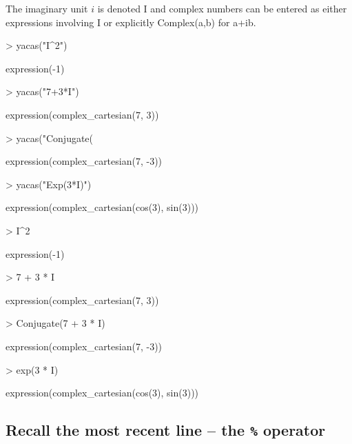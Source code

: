\documentclass[]{article}
\begin{document}
The imaginary unit $i$ is denoted I and complex numbers can be entered
as either expressions involving I or explicitly Complex(a,b) for a+ib.
\begin{Schunk}
\begin{Sinput}
> yacas("I^2")
\end{Sinput}
\begin{Soutput}
expression(-1)
\end{Soutput}
\begin{Sinput}
> yacas("7+3*I")
\end{Sinput}
\begin{Soutput}
expression(complex_cartesian(7, 3))
\end{Soutput}
\begin{Sinput}
> yacas("Conjugate(%)")
\end{Sinput}
\begin{Soutput}
expression(complex_cartesian(7, -3))
\end{Soutput}
\begin{Sinput}
> yacas("Exp(3*I)")
\end{Sinput}
\begin{Soutput}
expression(complex_cartesian(cos(3), sin(3)))
\end{Soutput}
\end{Schunk}

\begin{Schunk}
\begin{Sinput}
> I^2
\end{Sinput}
\begin{Soutput}
expression(-1)
\end{Soutput}
\begin{Sinput}
> 7 + 3 * I
\end{Sinput}
\begin{Soutput}
expression(complex_cartesian(7, 3))
\end{Soutput}
\begin{Sinput}
> Conjugate(7 + 3 * I)
\end{Sinput}
\begin{Soutput}
expression(complex_cartesian(7, -3))
\end{Soutput}
\begin{Sinput}
> exp(3 * I)
\end{Sinput}
\begin{Soutput}
expression(complex_cartesian(cos(3), sin(3)))
\end{Soutput}
\end{Schunk}


\subsection{Recall the most recent line -- the \texttt{\%} operator}
\end{document}
